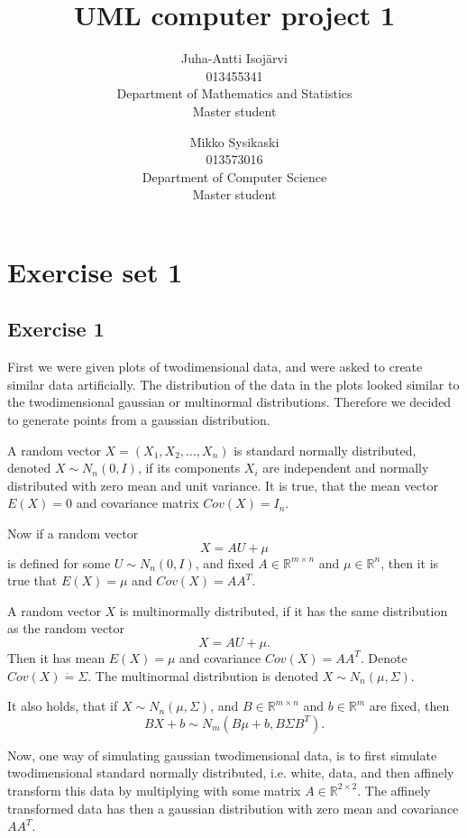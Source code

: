 \documentclass{article}
\begin{document}
\title{UML computer project 1}
\author{
Juha-Antti Isojärvi\\
013455341 \\
Department of Mathematics and Statistics\\
Master student
\and
Mikko Sysikaski\\
013573016\\
Department of Computer Science\\
Master student}
\date{}
\maketitle

\section{Exercise set 1}
\subsection{Exercise 1}
First we were given plots of twodimensional data, and were asked to
create similar data artificially. The distribution of the data in the plots looked
similar to the twodimensional gaussian or multinormal
distributions. Therefore we decided to generate points from a
gaussian distribution. 

A random vector $X = (X_1, X_2, \dots, X_n)$ is standard normally
distributed, denoted $X \sim N_n(0,I)$, if its components $X_i$ are independent and normally
distributed with zero mean and unit variance. It is true, that the
mean vector $E(X) = 0$ and covariance matrix $Cov(X) = I_n$.

Now if a random vector 
\[
X = AU + \mu
\] 
is defined for some $U \sim N_n(0,I)$, and fixed $A \in \mathbb{R}^{m \times n}$
and $\mu \in \mathbb{R}^n$, then it is true that $E(X) = \mu$ and
$Cov(X) = AA^T$.

A random vector $X$ is multinormally
distributed, if it has the same
distribution as the random vector
\[
X = AU + \mu.
\]
Then it has mean $E(X) = \mu$ and covariance $Cov(X) = AA^T$. Denote
$Cov(X) \dot{=} \Sigma$. The multinormal distribution is denoted $X
\sim N_n(\mu,\Sigma)$.

It also holds, that if $X \sim N_n(\mu,\Sigma)$, and $B \in
\mathbb{R}^{m \times n}$ and $b \in \mathbb{R}^m$ are fixed, then 
\[
BX + b \sim N_m(B\mu + b, B \Sigma B^T).
\]

Now, one way of simulating gaussian twodimensional data, is to first
simulate twodimensional standard normally distributed, i.e. white, data, and then
affinely transform this data by multiplying with some matrix $A \in
\mathbb{R}^{2\times 2}$. The affinely transformed data has then a
gaussian distribution with zero mean and covariance $AA^T$.
\end{document}
